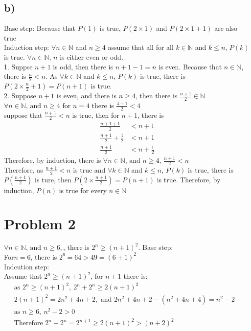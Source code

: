 \documentclass{article}
\begin{document}
    \subsection*{b)}
        Base step:\newline 
        Because that $P(1)$ is true, $P(2\times 1)$ and $P(2\times 1+1)$ are also true\\
        Induction step:\newline
        $\forall n\in \mathbb{N}$ and $n\geqslant 4$ assume that all 
        for all $k\in \mathbb{N}$ and $ k \leqslant n$, $P(k)$ is true. \(\forall n\in \mathbb{N}\), \(n\) is either even or odd.
        \\
        1. Suppse $n+1$ is odd, then there is $n+1-1=n$ is even. Because that \(n\in \mathbb{N}\), 
        there is \(\frac{n}{2} < n\). As $\forall k\in \mathbb{N}$ and $ k \leqslant n$, $P(k)$ is true, there is $P(2\times \frac{n}{2}+1) = P(n+1)$ is true.\\
        2. Suppose $n+1$ is even, and there is $n\geqslant 4$, then there is $\displaystyle{\frac {n+1}{2}\in \mathbb{N}}$
        \\
        $\forall n\in \mathbb{N}\text{, and } n\geqslant4$ for $n=4$ there is $\displaystyle{\frac{4+1}{2}<4}$\\
        suppose that $\displaystyle{\frac{n+1}{2}<n}$ is true, then for $n+1$, there is 
        \begin{align*}
            \frac{n+1+1}{2}&<n+1\\
            \frac{n+1}{2}+\frac{1}{2}&<n+1\\
            \frac{n+1}{2}&<n+\frac{1}{2}
        \end{align*}
        Therefore, by induction, there is $\forall n\in \mathbb{N}\text{, and } n\geqslant4$,  $\displaystyle{\frac{n+1}{2}<n}$\\
        Therefore, as $\displaystyle{\frac{n+1}{2}<n}$ is true and $\forall k\in \mathbb{N}$ and $ k \leqslant n$, $P(k)$ is true,
        there is $P(\frac{n+1}{2})$ is ture, then $P(2\times\frac{n+1}{2})=P(n+1)$ is true.
        Therefore, by induction, \(P(n)\) is true for every $n\in \mathbb{N}$
\section*{Problem 2}
    \(\forall n\in \mathbb{N}\text{, and }n\geqslant 6, \), there is \(2^n\geqslant(n+1)^2\).
    Base step:\\
    For\(n=6\), there is \(2^6=64>49=(6+1)^2\) \\
    Indcution step:\\
    Assume that \(2^n\geqslant(n+1)^2\), for \(n+1\) there is:\\
    \begin{align*}
        \text{as  } 2^n\geqslant(n+1)^2,\  2^n+2^n\geqslant 2(n+1)^2&\\
        2(n+1)^2=2n^2+4n+2, \text{ and } 2n^2+4n+2-(n^2+4n+4)=n^2-2\\
        \text{as }n\geqslant 6,\ n^2-2>0\\
        \text {Therefore }  2^n+2^n=2^{n+1}\geqslant2(n+1)^2>(n+2)^2
    \end{align*}
    
\end{document}
